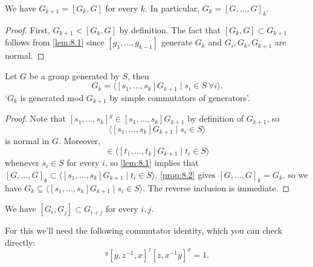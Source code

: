 \documentclass{article}
\numberwithin{equation}{section}
\begin{document}
\begin{nprop}\label{prop:8.2}
  We have $G_{k+1} = [G_k,G]$ for every $k$. In particular, $G_k = [G, \dotsc, G]_k$.
\end{nprop}
\begin{proof}
  First, $G_{k+1}  < [G_k,G]$ by definition.
  The fact that $[G_k,G] \subset G_{k+1}$ follows from \cref{lem:8.1} since $[g_1, \dotsc, g_{k-1}]$ generate $G_k$ and $G_i, G_k, G_{k+1}$ are normal.
\end{proof}
\begin{nprop}\label{prop:8.3}
  Let $G$ be a group generated by $S$, then
  \begin{equation*}
  G_k = \langle [s_1, \dotsc, s_k] G_{k+1} \mid s_i \in S \ \forall i\rangle.
  \end{equation*}
  `$G_k$ is generated mod $G_{k+1}$ by simple commutators of generators'.
\end{nprop}
\begin{proof}
  Note that $[s_1, \dotsc, s_k]^g \in [s_1, \dotsc, s_k] G_{k+1}$ by definition of $G_{k+1}$, so
  \begin{equation*}
  \langle[s_1, \dotsc, s_k] G_{k+1} \mid s_i \in S\rangle
  \end{equation*}
  is normal in $G$.
  Moreover,
  \begin{equation*}
  [s_1, \dotsc, s_k] \in \langle [t_1, \dotsc, t_k] G_{k+1} \mid t_i \in S\rangle
  \end{equation*}
  whenever $s_i \in S$ for every $i$, so \cref{lem:8.1} implies that
  $[G, \dotsc, G]_k \subset \langle [s_1, \dotsc, s_k] G_{k+1} \mid t_i \in S \rangle$.
  \cref{prop:8.2} gives $[G, \dotsc, G]_k = G_k$, so we have $G_k \subseteq \langle [s_1, \dotsc, s_k] G_{k+1} \mid s_i \in S \rangle$.
  The reverse inclusion is immediate.
\end{proof}
\begin{nprop}\label{prop:8.4}
  We have $[G_i, G_j] \subset G_{i+j}$ for every $i,j$.
\end{nprop}
For this we'll need the following commutator identity, which you can check directly:
\begin{equation}
  [x, y^{-1}, z]^y [y,z^{-1},x]^z [z,x^{-1} y]^x = 1. \label{eq:8.2}
\end{equation}
\end{document}
